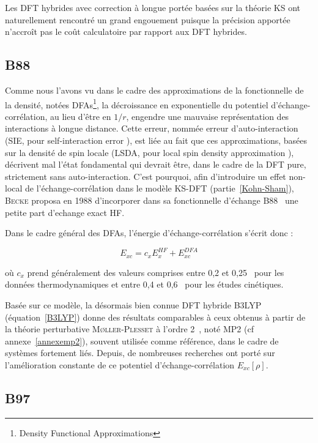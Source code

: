 {{Les DFT hybrides avec correction à longue portée basées sur la théorie KS ont naturellement rencontré un grand engouement puisque la précision apportée n'accroît pas le coût calculatoire par rapport aux DFT hybrides.

\subsection{B88}

Comme nous l'avons vu dans le cadre des approximations de la fonctionnelle de la densité, notées DFAs\footnote{\og Density Functional Approximations \fg{} }, la décroissance en exponentielle du potentiel d'échange-corrélation, au lieu d'être en $1/r$, engendre une mauvaise représentation des interactions à longue distance. Cette erreur, nommée erreur d'auto-interaction (SIE, pour \og self-interaction error \fg{}), est liée au fait que ces approximations, basées sur la densité de spin locale (LSDA, pour \og local spin density approximation \fg{}), décrivent mal l'état fondamental qui devrait être, dans le cadre de la DFT pure, strictement sans auto-interaction.     
C'est pourquoi, afin d'introduire un effet non-local de l'échange-corrélation dans le modèle KS-DFT (partie~\ref{Kohn-Sham}), \textsc{Becke} proposa en 1988 d'incorporer dans sa fonctionnelle d'échange B88~\cite{B88} une petite part d'echange exact HF. 

Dans le cadre général des DFAs, l'énergie d'échange-corrélation s'écrit donc :

\begin{equation}
E_{xc} = c_{x}E_{x}^{HF} + E_{xc}^{DFA}
\label{xcB88}
\end{equation}

\noindent où $c_{x}$ prend généralement des valeurs comprises entre 0,2 et 0,25~\cite{Bcxthermo} pour les données thermodynamiques et entre 0,4 et 0,6~\cite{Bcxcine} pour les études cinétiques.

Basée sur ce modèle, la désormais bien connue DFT hybride B3LYP~\cite{Bcxthermo} (équation~\ref{B3LYP}) donne des résultats comparables à ceux obtenus à partir de la théorie perturbative \textsc{M\o ller-Plesset} à l'ordre 2~\cite{MP2}, noté MP2 (cf annexe~\ref{annexemp2}), souvent utilisée comme référence, dans le cadre de systèmes fortement liés. Depuis, de nombreuses recherches ont porté sur l'amélioration constante de ce potentiel d'échange-corrélation $E_{xc}[\rho]$.

\subsection{B97}

}}
